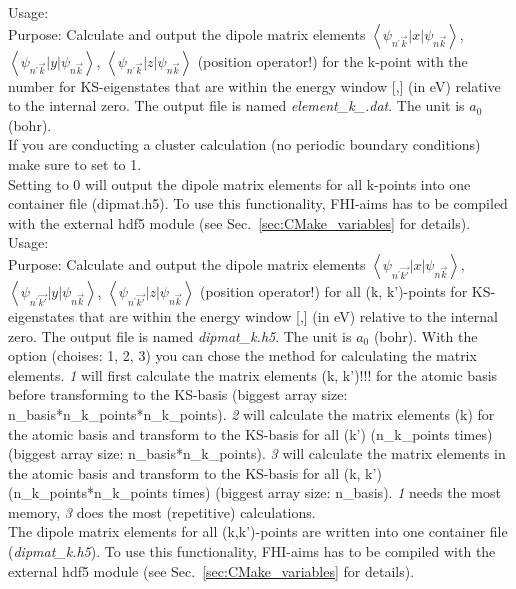 {
  \noindent
  Usage:    \\[1.0ex]
  Purpose: Calculate and output the dipole matrix elements $\left\langle\psi_{n^{'}\vec{k}}\vert x\vert\psi_{n\vec{k}}\right\rangle$, 
  $\left\langle\psi_{n^{'}\vec{k}}\vert y\vert\psi_{n\vec{k}}\right\rangle$, $\left\langle\psi_{n^{'}\vec{k}}\vert z\vert\psi_{n\vec{k}}\right\rangle$
  (position operator!) for the k-point with the number  for KS-eigenstates that are within the energy window [,] (in eV) relative to the 
  internal zero. The output file is named \textit{element\_k\_}\textit{.dat}. The unit is $a_0$ (bohr).\\
  If you are conducting a cluster calculation (no periodic boundary conditions) make sure to set  to 1.\\
  Setting  to 0 will output the dipole matrix elements for all k-points into one container file (dipmat.h5). To use this functionality, FHI-aims 
  has to be compiled with the external hdf5 module (see Sec.~\ref{sec:CMake_variables} for details).\\[1.0ex]
}
{
  \noindent
  Usage:    \\[1.0ex]
  Purpose: Calculate and output the dipole matrix elements $\left\langle\psi_{n^{'}\vec{k'}}\vert x\vert\psi_{n\vec{k}}\right\rangle$, 
  $\left\langle\psi_{n^{'}\vec{k'}}\vert y\vert\psi_{n\vec{k}}\right\rangle$, $\left\langle\psi_{n^{'}\vec{k'}}\vert z\vert\psi_{n\vec{k}}\right\rangle$
  (position operator!) for all (k, k')-points for KS-eigenstates that are within the energy window [,] (in eV) relative to the 
  internal zero. The output file is named \textit{dipmat\_k}\textit{.h5}. The unit is $a_0$ (bohr). With the option  (choises: 1, 2, 3) 
  you can chose the method for calculating the matrix elements. \textit{1} will first calculate the matrix elements (k, k')!!! for the atomic basis before 
  transforming to the KS-basis (biggest array size: n\_basis*n\_k\_points*n\_k\_points). \textit{2} will calculate the matrix elements (k) for the atomic basis and transform to 
  the KS-basis for all (k') (n\_k\_points times) (biggest array size: n\_basis*n\_k\_points). \textit{3} will calculate the matrix elements in the atomic basis and transform to 
  the KS-basis for all (k, k') (n\_k\_points*n\_k\_points times) (biggest array size: n\_basis). \textit{1} needs the most memory, \textit{3} does the most (repetitive) 
  calculations.\\
  The dipole matrix elements for all (k,k')-points are written into one container file (\textit{dipmat\_k}\textit{.h5}). To use this functionality, FHI-aims 
  has to be compiled with the external hdf5 module (see Sec.~\ref{sec:CMake_variables} for details).\\[1.0ex]
}

